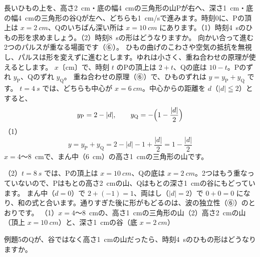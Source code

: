 \label{ph:波-5:ex5}
\begin{phreidai}[2つのパルスの重ね合わせ]
長いひもの上を、高さ\qty{2}{cm}・底の幅\qty{4}{cm}の三角形の山Pが右へ、深さ\qty{1}{cm}・底の幅\qty{4}{cm}の三角形の谷Qが左へ、どちらも\qty{1}{cm/s}で進みます。時刻0に、Pの頂上は $x=\qty{2}{cm}$、Qのいちばん深い所は $x=\qty{10}{cm}$ にあります。（1）時刻\qty{4}{s}のひもの形を求めましょう。（2）時刻\qty{8}{s}の形はどうなりますか。
\phbamen
向かい合って進む2つのパルスが重なる場面です（⑥）。
\phmushi
ひもの曲げのこわさや空気の抵抗を無視し、パルスは形を変えずに進むとします。ゆれは小さく、重ね合わせの原理が使えるとします。
\phzu
$x$〔cm〕で、時刻 $t$ のPの頂上は $2+t$、Qの底は $10-t$。Pのずれ $y_{\mathrm P}$、Qのずれ $y_{\mathrm Q}$。
\phriyu
重ね合わせの原理（⑥）で、ひものずれは $y=y_{\mathrm P}+y_{\mathrm Q}$ です。
\phtateru
$t=\qty{4}{s}$ では、どちらも中心が $x=\qty{6}{cm}$。中心からの距離を $d$（$|d|\leqq2$）とすると、
\[y_{\mathrm P}=2-|d|,\qquad y_{\mathrm Q}=-\Bigl(1-\frac{|d|}{2}\Bigr)\]
\phtoku
（1）\[y=y_{\mathrm P}+y_{\mathrm Q}=2-|d|-1+\frac{|d|}{2}=1-\frac{|d|}{2}\]
$x=4$〜\qty{8}{cm}で、まん中（\qty{6}{cm}）の高さ\qty{1}{cm}の三角形の山です。
\par\smallskip\noindent{}\par
（2）$t=\qty{8}{s}$ では、Pの頂上は $x=\qty{10}{cm}$、Qの底は $x=\qty{2}{cm}$。2つはもう重なっていないので、Pはもとの高さ\qty{2}{cm}の山、Qはもとの深さ\qty{1}{cm}の谷にもどっています。
\phtashikame
まん中（$d=0$）で $2+(-1)=1$、両はし（$|d|=2$）で $0+0=0$ になり、和の式と合います。通りすぎた後に形がもどるのは、波の独立性（⑥）のとおりです。
\kotae （1）$x=4$〜\qty{8}{cm}の、高さ\qty{1}{cm}の三角形の山（2）高さ\qty{2}{cm}の山（頂上 $x=\qty{10}{cm}$）と、深さ\qty{1}{cm}の谷（底 $x=\qty{2}{cm}$）
\end{phreidai}
\begin{jibun}
例題5のQが、谷ではなく高さ\qty{1}{cm}の山だったら、時刻\qty{4}{s}のひもの形はどうなりますか。
\end{jibun}

